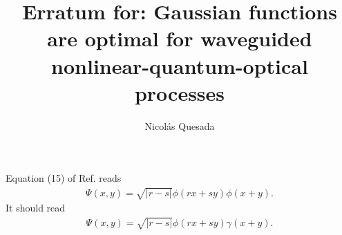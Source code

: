\documentclass[twocolumn,pra]{revtex4}
\newcommand{\eq}[1]{\begin{align}#1\end{align}}
\begin{document}
\title{Erratum for: Gaussian functions are optimal for waveguided nonlinear-quantum-optical processes}
\author{Nicol\'as Quesada}

\maketitle
Equation (15) of Ref. \cite{quesada2018gaussian} reads
\eq{
\Psi(x,y) = \sqrt{|r-s|} \phi(rx+sy)\phi(x+y).
}
It should read
\eq{
\Psi(x,y) = \sqrt{|r-s|} \phi(rx+sy)\gamma(x+y).
}



\end{document}
